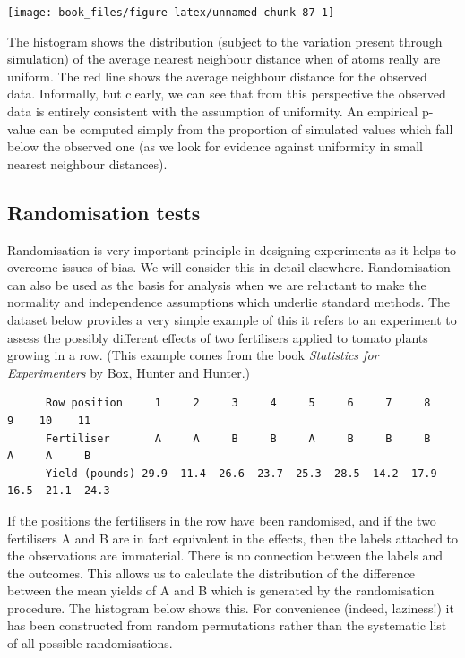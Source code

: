 \documentclass[
]{book}
\begin{document}
\begin{center}\texttt{[image: book\_files/figure-latex/unnamed-chunk-87-1]} \end{center}

The histogram shows the distribution (subject to the variation present through simulation) of the average nearest neighbour distance when of atoms really are uniform. The red line shows the average neighbour distance for the observed data. Informally, but clearly, we can see that from this perspective the observed data is entirely consistent with the assumption of uniformity. An empirical p-value can be computed simply from the proportion of simulated values which fall below the observed one (as we look for evidence against uniformity in small nearest neighbour distances).

\subsection{Randomisation tests}\label{randomisation-tests}

Randomisation is very important principle in designing experiments as it helps to overcome issues of bias. We will consider this in detail elsewhere. Randomisation can also be used as the basis for analysis when we are reluctant to make the normality and independence assumptions which underlie standard methods. The dataset below provides a very simple example of this it refers to an experiment to assess the possibly different effects of two fertilisers applied to tomato plants growing in a row. (This example comes from the book \emph{Statistics for Experimenters} by Box, Hunter and Hunter.)

\begin{verbatim}
      Row position     1     2     3     4     5     6     7     8     9    10    11
      Fertiliser       A     A     B     B     A     B     B     B     A     A     B
      Yield (pounds) 29.9  11.4  26.6  23.7  25.3  28.5  14.2  17.9  16.5  21.1  24.3
\end{verbatim}

If the positions the fertilisers in the row have been randomised, and if the two fertilisers A and B are in fact equivalent in the effects, then the labels attached to the observations are immaterial. There is no connection between the labels and the outcomes. This allows us to calculate the distribution of the difference between the mean yields of A and B which is generated by the randomisation procedure. The histogram below shows this. For convenience (indeed, laziness!) it has been constructed from random permutations rather than the systematic list of all possible randomisations.
\end{document}
